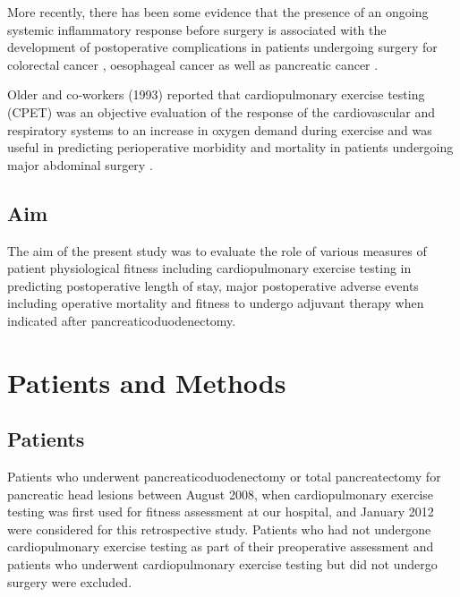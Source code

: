 More recently, there has been some evidence that the presence of an ongoing systemic inflammatory response before surgery is associated with the development of postoperative complications in patients undergoing surgery for colorectal cancer \parencite{moyes_preoperative_2009}, oesophageal cancer \parencite{vashist_glasgow_2010} as well as pancreatic cancer \parencite{knight_evaluation_2010}.

Older and co-workers (1993) reported that cardiopulmonary exercise testing (CPET) was an objective evaluation of the response of the cardiovascular and respiratory systems to an increase in oxygen demand during exercise and was useful in predicting perioperative morbidity and mortality in patients undergoing major abdominal surgery \parencite{older_preoperative_1993}.

\subsection{Aim}
The aim of the present study was to evaluate the role of various measures of patient physiological fitness including cardiopulmonary exercise testing in predicting postoperative length of stay, major postoperative adverse events including operative mortality and fitness to undergo adjuvant therapy when indicated after pancreaticoduodenectomy.
\clearpage

\section{Patients and Methods}

\subsection{Patients}
Patients who underwent pancreaticoduodenectomy or total pancreatectomy for pancreatic head lesions between August 2008, when cardiopulmonary exercise testing was first used for fitness assessment at our hospital, and January 2012 were considered for this retrospective study. 
Patients who had not undergone cardiopulmonary exercise testing as part of their preoperative assessment and patients who underwent cardiopulmonary exercise testing but did not undergo surgery were excluded. 

